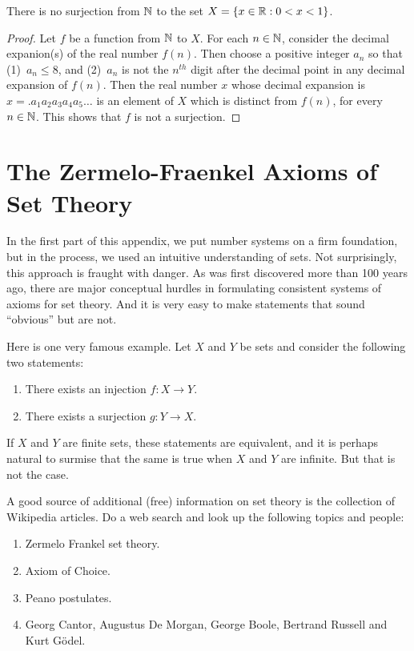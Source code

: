 \begin{proposition} 
There is no surjection from $\mathbb{N}$ to the
set $X= \{x\in\mathbb{R}:0<x<1\}$.
\end{proposition}

\begin{proof}
Let $f$ be a function from $\mathbb{N}$ to $X$.
For each $n\in \mathbb{N}$, consider the decimal
expanion(s) of the real number $f(n)$.  Then
choose a positive integer $a_n$ so that (1)~$a_n\le 8$, and
(2)~$a_n$ is not the $n^{th}$ digit after the decimal
point in any decimal expansion of $f(n)$.
Then the real number $x$ whose decimal expansion
is $x=.a_1a_2a_3a_4a_5\dots$ is an element of $X$
which is distinct from $f(n)$, for every $n\in\mathbb{N}$.
This shows that $f$ is not a surjection.
\end{proof}

\section{The Zermelo-Fraenkel Axioms of Set Theory}\label{s:background:ZFC}

In the first part of this appendix, 
we put number systems on a firm foundation, but in the
process, we used an intuitive understanding of sets.
Not surprisingly, this approach is fraught with danger.  As was first discovered
more than 100 years ago, there are major conceptual hurdles
in formulating consistent systems of axioms for set theory.
And it is very easy to make statements that sound ``obvious''
but are not.

Here is one very famous example.  Let $X$ and $Y$ be
sets and consider the following two
statements:

\begin{enumerate}
\item There exists an injection $f:X\rightarrow Y$.
\item There exists a surjection $g:Y\rightarrow X$.
\end{enumerate}
If $X$ and $Y$ are finite sets, these statements are
equivalent, and it is perhaps natural to surmise that the
same is true when $X$ and $Y$ are infinite.  But that is not
the case.

A good source of additional (free) information on set theory is
the collection of Wikipedia articles.  Do a web search and
look up the following topics and people:

\begin{enumerate}
\item Zermelo Frankel set theory.
\item Axiom of Choice.
\item Peano postulates.
\item Georg Cantor, Augustus De Morgan, George Boole, Bertrand Russell
and Kurt G\"odel.
\end{enumerate}

